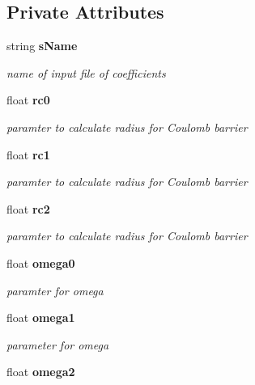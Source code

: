 \subsection*{Private Attributes}
\begin{CompactItemize}
\item 
string \bf{s\-Name}\label{classCSigCharged_01f9a1cab2ec8b56bb0793877bd60e2f}

\begin{CompactList}\small\item\em name of input file of coefficients \item\end{CompactList}\item 
float \bf{rc0}\label{classCSigCharged_2e9ec2ff0dcb3fb2c2bc9de795cf2d9f}

\begin{CompactList}\small\item\em paramter to calculate radius for Coulomb barrier \item\end{CompactList}\item 
float \bf{rc1}\label{classCSigCharged_95be4c57efdffcc3f3226a6f05eee5ef}

\begin{CompactList}\small\item\em paramter to calculate radius for Coulomb barrier \item\end{CompactList}\item 
float \bf{rc2}\label{classCSigCharged_0dcd5b2c790d16cb61f104f65d388894}

\begin{CompactList}\small\item\em paramter to calculate radius for Coulomb barrier \item\end{CompactList}\item 
float \bf{omega0}\label{classCSigCharged_68809d69d20bb519183353c3c906d00e}

\begin{CompactList}\small\item\em paramter for omega \item\end{CompactList}\item 
float \bf{omega1}\label{classCSigCharged_3c051766a9894adcad4e44b5ca32dcbc}

\begin{CompactList}\small\item\em parameter for omega \item\end{CompactList}\item 
float \bf{omega2}\label{classCSigCharged_a6c3fc42a9234e2e3a9c86e701b47ee8}


\end{CompactItemize}
